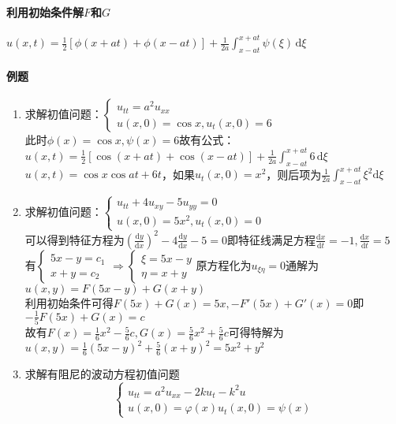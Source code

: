 \paragraph{利用初始条件解\(F\)和\(G\)}\(u(x,t)=\frac{1}{2}[\phi(x+at)+\phi(x-at)]+\frac{1}{2a}\int_{x-at}^{x+at}\psi(\xi)\,\mathrm{d}\xi\)

\paragraph{例题}
\begin{enumerate}
    \item 求解初值问题：\(\begin{cases}u_{tt}=a^2u_{xx}\\u(x,0)=\cos{x},u_t(x,0)=6\end{cases}\)\\
    此时\(\phi(x)=\cos{x},\psi(x)=6\)故有公式：\(u(x,t)=\frac{1}{2}\left[\cos{(x+at)}+\cos{(x-at)}\right]+\frac{1}{2a}\int_{x-at}^{x+at}6\,\mathrm{d}\xi\)\\
	\(u(x,t)=\cos{x}\cos{at}+6t\)，如果\(u_t(x,0)=x^2\)，则后项为\(\frac{1}{2a}\int_{x-at}^{x+at}\xi^2\mathrm{d}\xi\)
    \item 求解初值问题：\(\begin{cases}u_{tt}+4u_{xy}-5u_{yy}=0\\u(x,0)=5x^2,u_t(x,0)=0\end{cases}\)\\
    可以得到特征方程为\(\left(\frac{\mathrm{d}y}{\mathrm{d}x}\right)^2-4\frac{\mathrm{d}y}{\mathrm{d}x}-5=0\)即特征线满足方程\(\frac{\mathrm{d}x}{\mathrm{d}t}=-1,\frac{\mathrm{d}x}{\mathrm{d}t}=5\)\\
	有\(\begin{cases}5x-y=c_1\\x+y=c_2\end{cases}\Rightarrow\begin{cases}\xi=5x-y\\\eta=x+y\end{cases}\)原方程化为\(u_{\xi\eta}=0\)通解为\(u(x,y)=F(5x-y)+G(x+y)\)\\
    利用初始条件可得\(F(5x)+G(x)=5x,-F'(5x)+G'(x)=0\)即\(-\frac{1}{5}F(5x)+G(x)=c\)\\
	故有\(F(x)=\frac{1}{6}x^2-\frac{5}{6}c,G(x)=\frac{5}{6}x^2+\frac{5}{6}c\)可得特解为\(u(x,y)=\frac{1}{6}(5x-y)^2+\frac{5}{6}(x+y)^2=5x^2+y^2\)
    \item 求解有阻尼的波动方程初值问题\[\begin{cases}u_{tt}=a^2u_{xx}-2ku_t-k^2u\\u(x,0)=\varphi(x)u_t(x,0)=\psi(x)\end{cases}\]

\end{enumerate}
